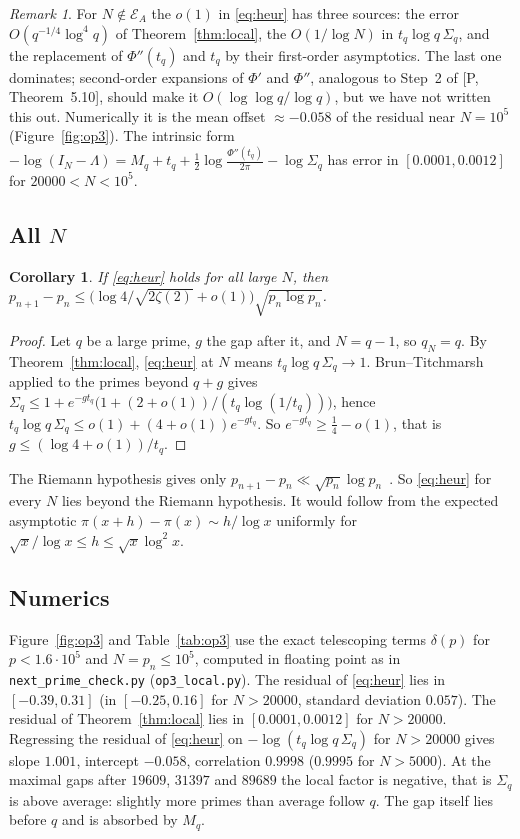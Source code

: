 \documentclass[11pt]{article}
\newtheorem{corollary}[theorem]{Corollary}
\theoremstyle{remark}
\newtheorem{remark}[theorem]{Remark}
\begin{document}
\begin{remark}
For $N\notin\mathcal E_A$ the $o(1)$ in \eqref{eq:heur} has three sources: the error
$O(q^{-1/4}\log^4q)$ of Theorem~\ref{thm:local}, the $O(1/\log N)$ in $t_q\log q\,\Sigma_q$, and
the replacement of $\Phi''(t_q)$ and $t_q$ by their first-order asymptotics. The last one
dominates; second-order expansions of $\Phi'$ and $\Phi''$, analogous to Step~2 of [P,
Theorem~5.10], should make it $O(\log\log q/\log q)$, but we have not written this out.
Numerically it is the mean offset $\approx-0.058$ of the residual near $N=10^5$
(Figure~\ref{fig:op3}). The intrinsic form
$-\log(I_N-\Lambda)=M_q+t_q+\frac12\log\frac{\Phi''(t_q)}{2\pi}-\log\Sigma_q$ has error in
$[0.0001,0.0012]$ for $20000<N<10^5$.
\end{remark}

\subsection{All \texorpdfstring{$N$}{N}}

\begin{corollary}\label{cor:allN}
If \eqref{eq:heur} holds for all large $N$, then
$p_{n+1}-p_n\le\bigl(\log4/\sqrt{2\zeta(2)}+o(1)\bigr)\sqrt{p_n\log p_n}$.
\end{corollary}

\begin{proof}
Let $q$ be a large prime, $g$ the gap after it, and $N=q-1$, so $q_N=q$. By
Theorem~\ref{thm:local}, \eqref{eq:heur} at $N$ means $t_q\log q\,\Sigma_q\to1$. Brun--Titchmarsh
applied to the primes beyond $q+g$ gives
$\Sigma_q\le1+e^{-gt_q}\bigl(1+(2+o(1))/(t_q\log(1/t_q))\bigr)$, hence
$t_q\log q\,\Sigma_q\le o(1)+(4+o(1))e^{-gt_q}$. So $e^{-gt_q}\ge\frac14-o(1)$, that is
$g\le(\log4+o(1))/t_q$.
\end{proof}

The Riemann hypothesis gives only $p_{n+1}-p_n\ll\sqrt{p_n}\log p_n$~\cite{Cramer}. So
\eqref{eq:heur} for every $N$ lies beyond the Riemann hypothesis. It would follow from the
expected asymptotic $\pi(x+h)-\pi(x)\sim h/\log x$ uniformly for
$\sqrt x/\log x\le h\le\sqrt x\log^2x$.

\subsection{Numerics}

Figure~\ref{fig:op3} and Table~\ref{tab:op3} use the exact telescoping terms $\delta(p)$ for
$p<1.6\cdot10^5$ and $N=p_n\le10^5$, computed in floating point as in \texttt{next\_prime\_check.py}
(\texttt{op3\_local.py}). The residual of \eqref{eq:heur} lies in $[-0.39,0.31]$ (in
$[-0.25,0.16]$ for $N>20000$, standard deviation $0.057$). The residual of
Theorem~\ref{thm:local} lies in $[0.0001,0.0012]$ for $N>20000$. Regressing the residual of
\eqref{eq:heur} on $-\log(t_q\log q\,\Sigma_q)$ for $N>20000$ gives slope $1.001$, intercept
$-0.058$, correlation $0.9998$ ($0.9995$ for $N>5000$). At the maximal gaps after $19609$,
$31397$ and $89689$ the local factor is negative, that is $\Sigma_q$ is above average: slightly
more primes than average follow $q$. The gap itself lies before $q$ and is absorbed by $M_q$.
\end{document}
